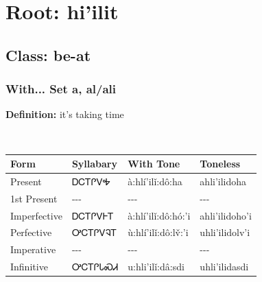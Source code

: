 \needspace{4in}
\section*{Root: hi'ilit}
\nopagebreak
{}
\needspace{3in}
\subsection*{Class: be-at}
\nopagebreak
\subsubsection*{With... Set a, al/ali}
\nopagebreak
\textbf{Definition: } it{\textquoteright}s taking time
\\[0.5em]
\begin{tabularx}{\textwidth}{l X X X}%
\toprule%
\textbf{Form}&\textbf{Syllabary}&\textbf{With Tone}&\textbf{Toneless}\\%
\midrule%
Present&ᎠᏟᎢᎵᏙᎭ&à:hlí’ilǐ:dô:ha&ahli’ilidoha\\%
1st Present&{-}{-}{-}&{-}{-}{-}&{-}{-}{-}\\%
Imperfective&ᎠᏟᎢᎵᏙᎰᎢ&à:hlí’ilǐ:dô:hó:’i&ahli’ilidoho’i\\%
Perfective&ᎤᏟᎢᎵᏙᎸᎢ&ù:hlí’ilǐ:dô:lv̌:’i&uhli’ilidolv’i\\%
Imperative&{-}{-}{-}&{-}{-}{-}&{-}{-}{-}\\%
Infinitive&ᎤᏟᎢᎵᏓᏍᏗ&u:hli’ilǐ:dâ:sdi&uhli’ilidasdi\\%
\bottomrule%
\end{tabularx}
\\[1em]